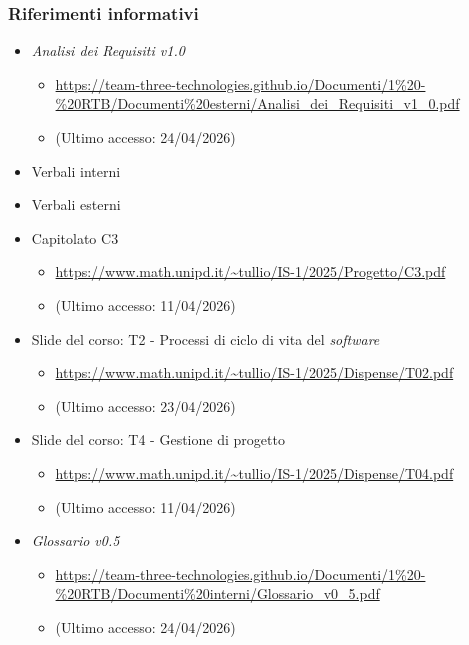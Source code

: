 \documentclass[a4paper,12pt]{article}
\begin{document}
{{            \subsubsection{Riferimenti informativi} {
                \begin{itemize}
                \item \textit{Analisi dei Requisiti v1.0}
                \begin{itemize}
                    \item \url{https://team-three-technologies.github.io/Documenti/1%20-%20RTB/Documenti%20esterni/Analisi_dei_Requisiti_v1_0.pdf}
                    \item[] (Ultimo accesso: 24/04/2026)
                \end{itemize}
                \item Verbali interni
                \item Verbali esterni
                \item Capitolato C3
                \begin{itemize}
                    \item \url{https://www.math.unipd.it/~tullio/IS-1/2025/Progetto/C3.pdf}
                    \item[] (Ultimo accesso: 11/04/2026)
                \end{itemize}
                \item Slide del corso: T2 - Processi di ciclo di vita del \textit{software}
                \begin{itemize}
                    \item \url{https://www.math.unipd.it/~tullio/IS-1/2025/Dispense/T02.pdf}
                    \item[] (Ultimo accesso: 23/04/2026)
                \end{itemize}
                \item Slide del corso: T4 - Gestione di progetto
                \begin{itemize}
                    \item \url{https://www.math.unipd.it/~tullio/IS-1/2025/Dispense/T04.pdf}
                    \item[] (Ultimo accesso: 11/04/2026)
                \end{itemize}
                \item \textit{Glossario v0.5}
                \begin{itemize}
                    \item \url{https://team-three-technologies.github.io/Documenti/1%20-%20RTB/Documenti%20interni/Glossario_v0_5.pdf}
                    \item[] (Ultimo accesso: 24/04/2026)
                \end{itemize}
            \end{itemize}
            }
        }
    }
    
\end{document}
